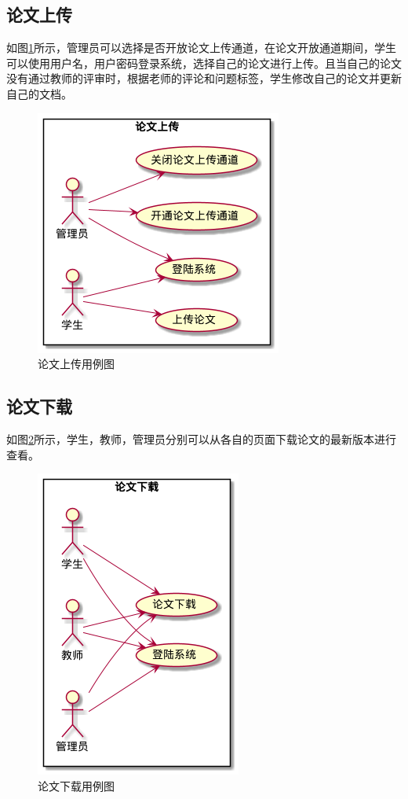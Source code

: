 \subsection{论文上传}

如图\ref{upload-usecase}所示，管理员可以选择是否开放论文上传通道，在论文开放通道期间，学生可以使用用户名，用户密码登录系统，选择自己的论文进行上传。且当自己的论文没有通过教师的评审时，根据老师的评论和问题标签，学生修改自己的论文并更新自己的文档。

\begin{figure}[htbp]
    \centering
    \includegraphics[scale = 0.6]{out/uml/用例图/2-论文上传/2-论文上传.png}
    \caption{\song\wuhao 论文上传用例图}
    \label{upload-usecase}
\end{figure}

\subsection{论文下载}

如图\ref{download-usecase}所示，学生，教师，管理员分别可以从各自的页面下载论文的最新版本进行查看。

\begin{figure}[htbp]
    \centering
    \includegraphics[scale = 0.6]{out/uml/用例图/5-论文下载/5-论文下载.png}
    \caption{\song\wuhao 论文下载用例图}
    \label{download-usecase}
\end{figure}

